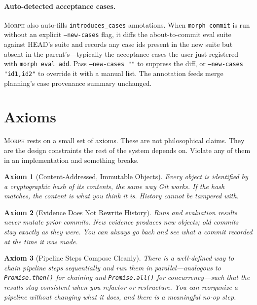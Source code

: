 \documentclass{article}
\newtheorem{axiom}{Axiom}
\begin{document}
\paragraph{Auto-detected acceptance cases.}
\textsc{Morph} also auto-fills \texttt{introduces\_cases} annotations. When
\texttt{morph commit} is run without an explicit \texttt{--new-cases} flag, it
diffs the about-to-commit eval suite against HEAD's suite and records any
case ids present in the new suite but absent in the parent's---typically the
acceptance cases the user just registered with \texttt{morph eval add}.
Pass \texttt{--new-cases ""} to suppress the diff, or
\texttt{--new-cases "id1,id2"} to override it with a manual list. The
annotation feeds merge planning's case provenance summary unchanged.

\section{Axioms}
\label{sec:axioms}

\textsc{Morph} rests on a small set of axioms. These are not philosophical
claims. They are the design constraints the rest of the system depends on.
Violate any of them in an implementation and something breaks.

\begin{axiom}[Content-Addressed, Immutable Objects]
Every object is identified by a cryptographic hash of its contents, the same
way Git works. If the hash matches, the content is what you think it is.
History cannot be tampered with.
\end{axiom}

\begin{axiom}[Evidence Does Not Rewrite History]
Runs and evaluation results never mutate prior commits. New evidence produces
new objects; old commits stay exactly as they were. You can always go back and
see what a commit recorded at the time it was made.
\end{axiom}

\begin{axiom}[Pipeline Steps Compose Cleanly]
There is a well-defined way to chain pipeline steps sequentially and run them
in parallel---analogous to \texttt{Promise.then()} for chaining and
\texttt{Promise.all()} for concurrency---such that the results stay consistent
when you refactor or restructure. You can reorganize a pipeline without
changing what it does, and there is a meaningful no-op step.
\end{axiom}
\end{document}
